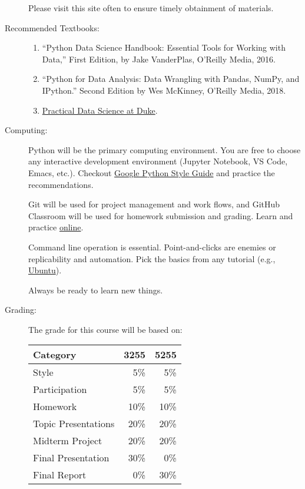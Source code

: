 \documentclass{article}
\let\proglang=\textsf
\begin{document}
\begin{multicols}{2}
\begin{description}
  Please visit this site often to ensure timely obtainment of materials.
  
\item[Recommended Textbooks:]\hspace{0pt}
  \begin{enumerate}
  \item 
    ``Python Data Science Handbook: Essential Tools for Working with
    Data,'' First Edition, by Jake VanderPlas, O’Reilly Media, 2016.
 
  \item
    ``Python for Data Analysis: Data Wrangling with Pandas, NumPy, and
    IPython.''  Second Edition by Wes McKinney, O’Reilly Media, 2018.
  \item
    \href{https://www.practicaldatascience.org/html/not_a_mids_student.html}{Practical
    Data Science at Duke}.
  \end{enumerate}

\item[Computing:]
  \proglang{Python} will be the primary computing environment. You are
  free to choose any interactive development environment (Jupyter
  Notebook, VS Code, Emacs, etc.). Checkout
  \href{https://google.github.io/styleguide/pyguide.html}{Google
  Python Style Guide} and practice the recommendations.

  Git will be used for project management and work flows, and GitHub
  Classroom will be used for homework submission and grading. Learn
  and practice \href{https://gitexercises.fracz.com}{online}.

  Command line operation is essential. Point-and-clicks are enemies or
  replicability and automation. Pick the basics from any tutorial
  (e.g.,
  \href{https://ubuntu.com/tutorials/command-line-for-beginners}{Ubuntu}).

  Always be ready to learn new things.

\item[Grading:]
The grade for this course will be based on:
\begin{center}
  \begin{tabular}{lrr}
    \toprule
    Category                & 3255   & 5255\\
    \midrule
    Style                       &  5\%   & 5\%\\
    Participation           &  5\%   & 5\%\\
    Homework              &  10\% & 10\%\\
    Topic Presentations&  20\% & 20\%\\
    Midterm Project       &  20\% & 20\%\\
    Final Presentation    &  30\% & 0\%\\
    Final Report             &  0\% & 30\%\\
    \bottomrule
  \end{tabular}
\end{center} 


\end{description}
\end{multicols}
\end{document}
